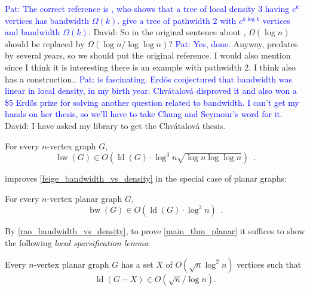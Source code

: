 \documentclass{patmorin}
\newcommand{\david}[1]{{\color{orange} David: #1}}
\newcommand{\pat}[1]{\textcolor{Blue}{Pat: #1}}
\newcommand{\defin}[1]{\emph{\textcolor{brightmaroon}{#1}}}
\DeclareMathOperator{\bw}{bw}
\DeclareMathOperator{\ld}{ld}
\begin{document}
\pat{The correct reference is \citet{chvatalova:on}, who shows that a tree of local density $3$ having $c^k$ vertices has bandwidth $\Omega(k)$.  \citet{CS89} give a tree of pathwidth $2$ with $c^{k\log k}$ vertices and bandwidth $\Omega(k)$.} \david{So in the original sentence about \cite{CS89}, $\Omega(\log n)$ should be replaced by $\Omega(\log n/ \log\log n)$? \pat{Yes, done.} Anyway, 
\citet{chvatalova:on} predates \citep{CS89} by several years, so we should put the original reference. I would also mention \citet{CS89} since I think it is interesting there is an example with pathwidth 2. I think \citet{CCDG82} also has a construction.}. \pat{\citet{CCDG82} is fascinating.  Erd\"os conjectured that bandwidth was linear in local density, in my birth year. Chvátalová disproved it and also won a \$5 Erd\H{o}s prize for solving another question related to bandwidth.  I can't get my hands on her thesis, so we'll have to take Chung and Seymour's word for it.} \david{I have asked my library to get the  Chvátalová  thesis.}

\begin{thm}
\label{feige_bandwidth_vs_density}
  For every $n$-vertex graph $G$,
  \[
    \bw(G)\in O\left(\ld(G)\cdot \log^3 n\sqrt{\log n\log\log n}\right) \enspace .
  \]
\end{thm}

\citet{rao:small} improves \cref{feige_bandwidth_vs_density} in the special case of planar graphs:%

\begin{thm}
\label{rao_bandwidth_vs_density}
  For every $n$-vertex planar graph $G$,
  \[
    \bw(G)\in O\left(\ld(G)\cdot \log^3 n\right) \enspace .
  \]
\end{thm}

By \cref{rao_bandwidth_vs_density}, to prove \cref{main_thm_planar} it suffices to show the following \defin{local sparsification lemma}:

\begin{lem}\label{planar_sparsification_special}
  Every $n$-vertex planar graph $G$ has a set $X$ of $O(\sqrt{n}\log^2 n)$ vertices such that 
  $$\ld(G-X)\in O(\sqrt{n}/\log n).$$
\end{lem}

\end{document}
